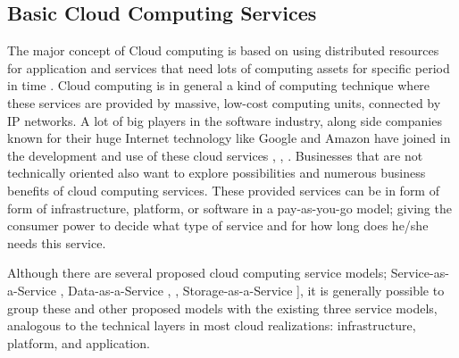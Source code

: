 



\subsection{Basic Cloud Computing Services}\label{subsection:computing_Services}
The major concept of Cloud computing is based on using distributed resources for application and services that need lots of computing assets for specific period in time \cite{khasnabish2012cloud}. Cloud computing is in general a kind of computing technique where these  services are provided by massive, low-cost computing units, connected by IP networks. A lot of big players in the software industry, along side companies known for their huge Internet technology like Google and Amazon have joined in the development and use of these cloud services \cite{armbrust2009above}, \cite{hilley2009cloud}, \cite{lin2009cloud}. Businesses that are not technically oriented also want to explore possibilities and numerous business benefits of cloud computing services. These provided services can be in form of form  of  infrastructure,  platform,  or  software in  a  pay-as-you-go  model; giving the consumer power to decide what type of service and for how long does he/she needs this service.

Although there are several proposed cloud computing service models; Service-as-a-Service \cite{li2010intel}, Data-as-a-Service \cite{hilley2009cloud}, \cite{wang2010cloud}, Storage-as-a-Service \cite{hilley2009cloud}], it is generally possible to group these and other proposed models with the existing three service models, analogous to the technical layers in most cloud realizations: infrastructure, platform, and application.

